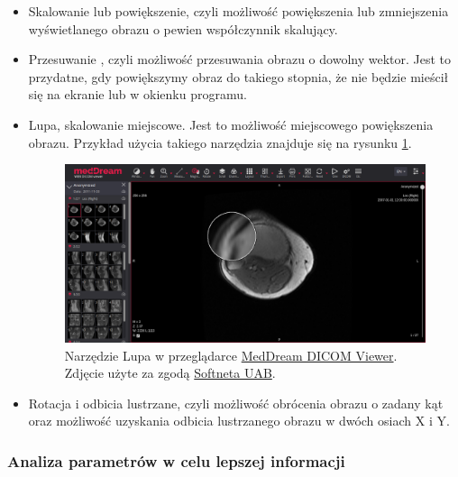 \begin{itemize}
    \item Skalowanie lub powiększenie, czyli możliwość powiększenia lub zmniejszenia wyświetlanego obrazu o pewien współczynnik skalujący.

    \item Przesuwanie , czyli możliwość przesuwania obrazu o dowolny wektor.
          Jest to przydatne, gdy powiększymy obraz do takiego stopnia, że nie będzie mieścił się na ekranie lub w okienku programu.

    \item Lupa, skalowanie miejscowe.
          Jest to możliwość miejscowego powiększenia obrazu.
          Przykład użycia takiego narzędzia znajduje się na rysunku \ref{fig:wyswietlanie001}.

          \begin{figure}[!htbp]
              \centering
              \includegraphics[width=\textwidth]{img/wyswietlanie001.png}
              \caption{Narzędzie Lupa w przeglądarce \href{https://www.softneta.com/products/meddream-dicom-viewer/}{MedDream DICOM Viewer}. Zdjęcie użyte za zgodą \href{https://www.softneta.com/}{Softneta UAB}.}
              \label{fig:wyswietlanie001}
          \end{figure}

    \item Rotacja i odbicia lustrzane, czyli możliwość obrócenia obrazu o zadany kąt oraz możliwość uzyskania odbicia lustrzanego obrazu w dwóch osiach X i Y.

\end{itemize}

\subsubsection{Analiza parametrów w celu lepszej informacji}

